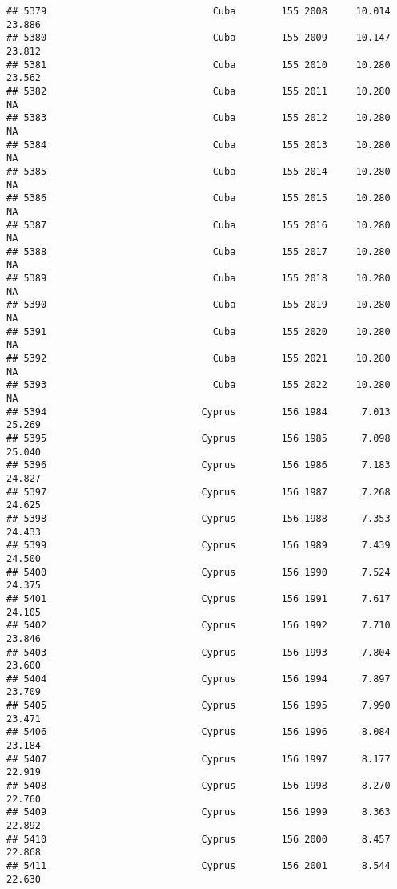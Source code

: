 \documentclass[
]{article}
\begin{document}
\begin{verbatim}
## 5379                             Cuba        155 2008     10.014     23.886
## 5380                             Cuba        155 2009     10.147     23.812
## 5381                             Cuba        155 2010     10.280     23.562
## 5382                             Cuba        155 2011     10.280         NA
## 5383                             Cuba        155 2012     10.280         NA
## 5384                             Cuba        155 2013     10.280         NA
## 5385                             Cuba        155 2014     10.280         NA
## 5386                             Cuba        155 2015     10.280         NA
## 5387                             Cuba        155 2016     10.280         NA
## 5388                             Cuba        155 2017     10.280         NA
## 5389                             Cuba        155 2018     10.280         NA
## 5390                             Cuba        155 2019     10.280         NA
## 5391                             Cuba        155 2020     10.280         NA
## 5392                             Cuba        155 2021     10.280         NA
## 5393                             Cuba        155 2022     10.280         NA
## 5394                           Cyprus        156 1984      7.013     25.269
## 5395                           Cyprus        156 1985      7.098     25.040
## 5396                           Cyprus        156 1986      7.183     24.827
## 5397                           Cyprus        156 1987      7.268     24.625
## 5398                           Cyprus        156 1988      7.353     24.433
## 5399                           Cyprus        156 1989      7.439     24.500
## 5400                           Cyprus        156 1990      7.524     24.375
## 5401                           Cyprus        156 1991      7.617     24.105
## 5402                           Cyprus        156 1992      7.710     23.846
## 5403                           Cyprus        156 1993      7.804     23.600
## 5404                           Cyprus        156 1994      7.897     23.709
## 5405                           Cyprus        156 1995      7.990     23.471
## 5406                           Cyprus        156 1996      8.084     23.184
## 5407                           Cyprus        156 1997      8.177     22.919
## 5408                           Cyprus        156 1998      8.270     22.760
## 5409                           Cyprus        156 1999      8.363     22.892
## 5410                           Cyprus        156 2000      8.457     22.868
## 5411                           Cyprus        156 2001      8.544     22.630

\end{verbatim}
\end{document}
